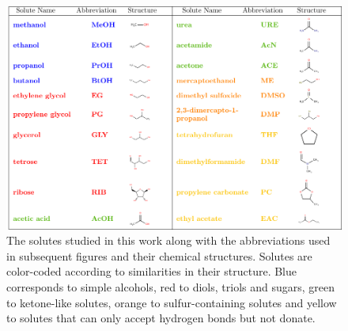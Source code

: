 \documentclass{article}
\begin{document}
  \begin{figure}
  \includegraphics[width=\textwidth]{solute_table.pdf}
  \caption{The solutes studied in this work along with the abbreviations used
  in subsequent figures and their chemical structures. Solutes are color-coded
  according to similarities in their structure. Blue corresponds to simple 
  alcohols, red to diols, triols and sugars, green to ketone-like solutes, 
  orange to sulfur-containing solutes and yellow to solutes that can only accept
  hydrogen bonds but not donate.}\label{fig:solute_table}
  \vspace{-0.5cm}
  \end{figure}

  
\end{document}
